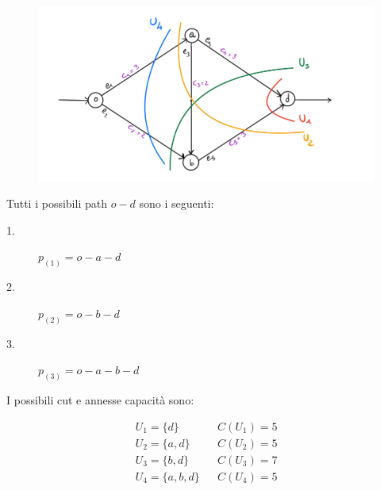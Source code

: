 \documentclass[11pt,largemargins]{homework}
\begin{document}
\maketitle

\question

  \begin{figure}[htb]\centering
    \includegraphics[scale=0.17]{ES1_Fig1.jpg}
  \end{figure}
  Tutti i possibili path \(o-d\) sono i seguenti:

  \begin{description}
    \item[1.] \(p_{(1)}= o -a-d\)
    \item[2.] \(p_{(2)}=o-b-d\) 
    \item[3.] \(p_{(3)}= o-a-b-d\) 
  \end{description}

  I possibili cut e annesse capacità sono:

  \begin{align*}
    U_1 = \{d\}\  && C(U_1)=5 \\
    U_2 = \{a, d\} && C(U_2)=5 \\
    U_3 = \{b,d\} && C(U_3)=7 \\
    U_4 = \{a,b,d\} && C(U_4)=5
  \end{align*}
  
\end{document}
